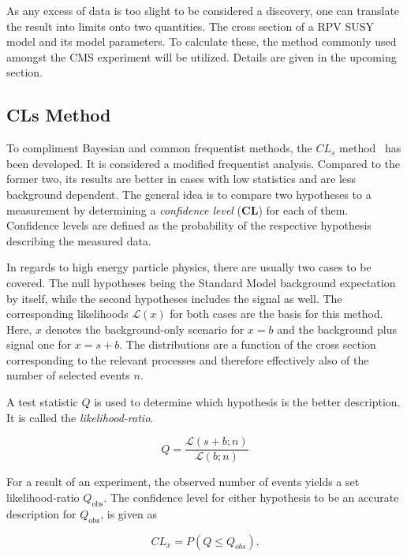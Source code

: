 As any excess of data is too slight to be considered a discovery, one can translate the result into limits onto two quantities. The cross section of a RPV SUSY model and its model parameters. To calculate these, the method commonly used amongst the CMS experiment will be utilized. Details are given in the upcoming section.


\subsection{CLs Method}
\label{sec:cls-method}

To compliment Bayesian and common frequentist methods, the $CL_s$ method~\cite{cls,cls2} has been developed. It is considered a modified frequentist analysis. Compared to the former two, its results are better in cases with low statistics and are less background dependent. The general idea is to compare two hypotheses to a measurement by determining a \textit{confidence level} (\textbf{CL}) for each of them. Confidence levels are defined as the probability of the respective hypothesis describing the measured data.

In regards to high energy particle physics, there are usually two cases to be covered. The null hypotheses being the Standard Model background expectation by itself, while the second hypotheses includes the signal as well. The corresponding likelihoods $\mathcal{L} (x)$ for both cases are the basis for this method. Here, $x$ denotes the background-only scenario for $x = b$ and the background plus signal one for $x = s + b$. The distributions are a function of the cross section corresponding to the relevant processes and therefore effectively also of the number of selected events $n$.

A test statistic $Q$ is used to determine which hypothesis is the better description. It is called the \textit{likelihood-ratio}.

\begin{equation}
  \label{eq:testq}
  Q = \frac{\mathcal{L} (s + b; n)}{\mathcal{L} (b; n)}
\end{equation}

For a result of an experiment, the observed number of events yields a set likelihood-ratio $Q_{\text{obs}}$. The confidence level for either hypothesis to be an accurate description for $Q_{\text{obs}}$, is given as

\begin{equation}
  \label{eq:cl-prob}
  CL_x = P (Q \leq Q_{obs}).
\end{equation}

